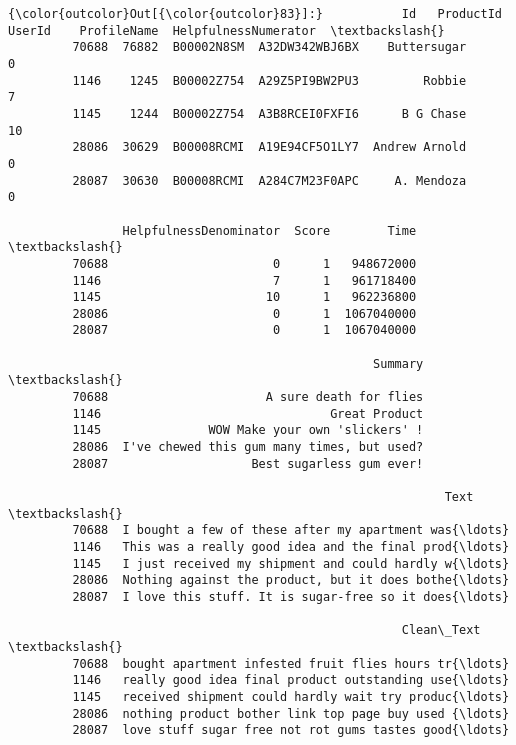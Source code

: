 \documentclass[11pt]{article}
\begin{document}
\begin{Verbatim}[commandchars=\\\{\}]
{\color{outcolor}Out[{\color{outcolor}83}]:}           Id   ProductId          UserId    ProfileName  HelpfulnessNumerator  \textbackslash{}
         70688  76882  B00002N8SM  A32DW342WBJ6BX    Buttersugar                     0   
         1146    1245  B00002Z754  A29Z5PI9BW2PU3         Robbie                     7   
         1145    1244  B00002Z754  A3B8RCEI0FXFI6      B G Chase                    10   
         28086  30629  B00008RCMI  A19E94CF5O1LY7  Andrew Arnold                     0   
         28087  30630  B00008RCMI  A284C7M23F0APC     A. Mendoza                     0   
         
                HelpfulnessDenominator  Score        Time  \textbackslash{}
         70688                       0      1   948672000   
         1146                        7      1   961718400   
         1145                       10      1   962236800   
         28086                       0      1  1067040000   
         28087                       0      1  1067040000   
         
                                                   Summary  \textbackslash{}
         70688                      A sure death for flies   
         1146                                Great Product   
         1145               WOW Make your own 'slickers' !   
         28086  I've chewed this gum many times, but used?   
         28087                    Best sugarless gum ever!   
         
                                                             Text  \textbackslash{}
         70688  I bought a few of these after my apartment was{\ldots}   
         1146   This was a really good idea and the final prod{\ldots}   
         1145   I just received my shipment and could hardly w{\ldots}   
         28086  Nothing against the product, but it does bothe{\ldots}   
         28087  I love this stuff. It is sugar-free so it does{\ldots}   
         
                                                       Clean\_Text  \textbackslash{}
         70688  bought apartment infested fruit flies hours tr{\ldots}   
         1146   really good idea final product outstanding use{\ldots}   
         1145   received shipment could hardly wait try produc{\ldots}   
         28086  nothing product bother link top page buy used {\ldots}   
         28087  love stuff sugar free not rot gums tastes good{\ldots}   
         

\end{Verbatim}
\end{document}
